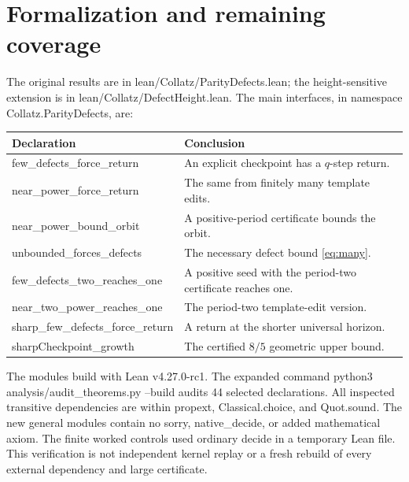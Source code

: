 \documentclass[11pt]{article}
\newcommand{\code}[1]{{\small\ttfamily #1}}
\begin{document}
\section{Formalization and remaining coverage}
The original results are in \code{lean/Collatz/ParityDefects.lean};
the height-sensitive extension is in \code{lean/Collatz/DefectHeight.lean}.
The main interfaces, in namespace \code{Collatz.ParityDefects}, are:
\begin{center}
\begin{tabularx}{\textwidth}{@{}lX@{}}
\toprule
Declaration&Conclusion\\
\midrule
\code{few\_\allowbreak{}defects\_\allowbreak{}force\_\allowbreak{}return}&An explicit checkpoint has a $q$-step return.\\
\code{near\_\allowbreak{}power\_\allowbreak{}force\_\allowbreak{}return}&The same from finitely many template edits.\\
\code{near\_\allowbreak{}power\_\allowbreak{}bound\_\allowbreak{}orbit}&A positive-period certificate bounds the orbit.\\
\code{unbounded\_\allowbreak{}forces\_\allowbreak{}defects}&The necessary defect bound \eqref{eq:many}.\\
\code{few\_\allowbreak{}defects\_\allowbreak{}two\_\allowbreak{}reaches\_\allowbreak{}one}&A positive seed with the period-two certificate reaches one.\\
\code{near\_\allowbreak{}two\_\allowbreak{}power\_\allowbreak{}reaches\_\allowbreak{}one}&The period-two template-edit version.\\
\code{sharp\_\allowbreak{}few\_\allowbreak{}defects\_\allowbreak{}force\_\allowbreak{}return}&A return at the shorter universal horizon.\\
\code{sharpCheckpoint\_\allowbreak{}growth}&The certified $8/5$ geometric upper bound.\\
\bottomrule
\end{tabularx}
\end{center}
The modules build with Lean \code{v4.27.0-rc1}. The expanded command
\code{python3 analysis/audit\_\allowbreak{}theorems.py --build}
audits 44 selected declarations. All inspected transitive dependencies
are within \code{propext}, \code{Classical.choice}, and \code{Quot.sound}.
The new general modules contain no \code{sorry},
\code{native\_\allowbreak{}decide}, or added mathematical axiom.
The finite worked controls used ordinary \code{decide} in a temporary
Lean file. This verification is not independent kernel replay or a
fresh rebuild of every external dependency and large certificate.
\end{document}
